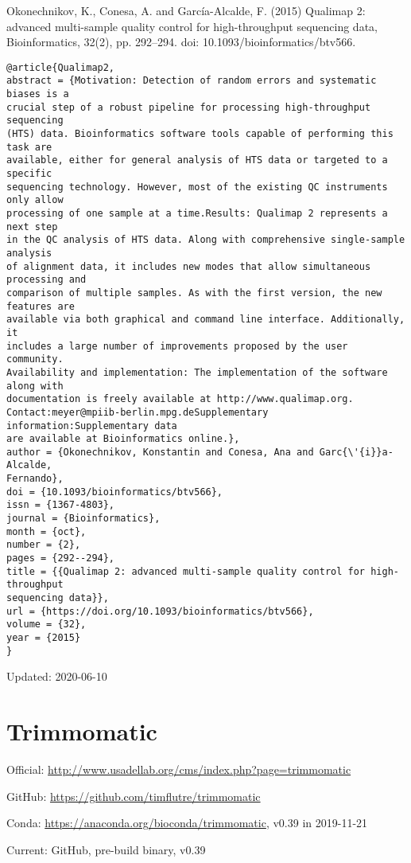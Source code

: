 \documentclass[]{article}
\begin{document}
Okonechnikov, K., Conesa, A. and García-Alcalde, F. (2015) Qualimap 2: advanced multi-sample quality control for high-throughput sequencing data, Bioinformatics, 32(2), pp. 292–294. doi: 10.1093/bioinformatics/btv566.

\begin{verbatim}
@article{Qualimap2,
abstract = {Motivation: Detection of random errors and systematic biases is a
crucial step of a robust pipeline for processing high-throughput sequencing
(HTS) data. Bioinformatics software tools capable of performing this task are
available, either for general analysis of HTS data or targeted to a specific
sequencing technology. However, most of the existing QC instruments only allow
processing of one sample at a time.Results: Qualimap 2 represents a next step
in the QC analysis of HTS data. Along with comprehensive single-sample analysis
of alignment data, it includes new modes that allow simultaneous processing and
comparison of multiple samples. As with the first version, the new features are
available via both graphical and command line interface. Additionally, it
includes a large number of improvements proposed by the user community.
Availability and implementation: The implementation of the software along with
documentation is freely available at http://www.qualimap.org.
Contact:meyer@mpiib-berlin.mpg.deSupplementary information:Supplementary data
are available at Bioinformatics online.},
author = {Okonechnikov, Konstantin and Conesa, Ana and Garc{\'{i}}a-Alcalde, 
Fernando},
doi = {10.1093/bioinformatics/btv566},
issn = {1367-4803},
journal = {Bioinformatics},
month = {oct},
number = {2},
pages = {292--294},
title = {{Qualimap 2: advanced multi-sample quality control for high-throughput 
sequencing data}},
url = {https://doi.org/10.1093/bioinformatics/btv566},
volume = {32},
year = {2015}
}
\end{verbatim}

Updated: 2020-06-10

\section{Trimmomatic}

Official: \url{http://www.usadellab.org/cms/index.php?page=trimmomatic}

GitHub: \url{https://github.com/timflutre/trimmomatic}

Conda: \url{https://anaconda.org/bioconda/trimmomatic}, v0.39 in 2019-11-21

Current: GitHub, pre-build binary, v0.39
\end{document}

